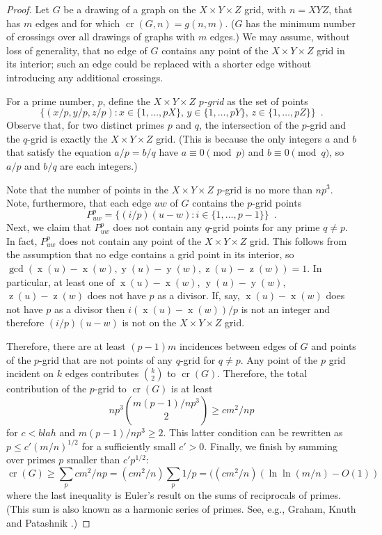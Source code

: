 \documentclass{patmorin}
\DeclareMathOperator{\x}{x}
\DeclareMathOperator{\y}{y}
\DeclareMathOperator{\z}{z}
\DeclareMathOperator{\crs}{cr}
\begin{document}
\begin{proof}
Let $G$ be a drawing of a graph on the $X\times Y\times Z$ grid, with
$n=XYZ$, that has $m$ edges and for which $\crs(G,n)=g(n,m)$. ($G$
has the minimum number of crossings over all drawings of graphs with
$m$ edges.)  We may assume, without loss of generality, that no edge of
$G$ contains any point of the $X\times Y\times Z$ grid in its interior;
such an edge could be replaced with a shorter edge without introducing
any additional crossings.

For a prime number, $p$, define the $X\times Y\times Z$ \emph{$p$-grid}
as the set of points
\[
  \{(x/p,y/p,z/p): x\in\{1,\ldots,pX\},\, y\in\{1,\ldots,pY\},\,
  z\in\{1,\ldots,pZ\}\} \enspace .
\]
Observe that, for two distinct primes $p$ and $q$, the intersection
of the $p$-grid and the $q$-grid is exactly the $X\times Y\times Z$
grid. (This is because the only integers $a$ and $b$ that satisfy the
equation $a/p = b/q$ have $a\equiv 0 \pmod{p}$ and $b\equiv 0\pmod q$,
so $a/p$ and $b/q$ are each integers.)

Note that the number of points in the $X\times Y\times Z$ $p$-grid is
no more than $np^3$.  Note, furthermore, that each edge $uw$ of $G$
contains the $p$-grid points
\[
    P_{uw}^p = \{ (i/p)(u-w) : i\in\{1,\ldots,p-1\} \} \enspace .
\]
Next, we claim that $P_{uw}^p$ does not contain any $q$-grid points for
any prime $q\neq p$.  In fact, $P_{uw}^p$ does not contain any point of
the $X\times Y\times Z$ grid.  This follows from the assumption that
no edge contains a grid point in its interior, so $\gcd(\x(u)-\x(w),
\y(u)-\y(w), \z(u)-\z(w))=1$.  In particular, at least one of
$\x(u)-\x(w)$, $\y(u)-\y(w)$, $\z(u)-\z(w)$ does not have $p$ as a
divisor.  If, say, $\x(u)-\x(w)$ does not have $p$ as a divisor then
$i(\x(u)-\x(w))/p$ is not an integer and therefore $(i/p)(u-w)$ is not
on the $X\times Y\times Z$ grid.

Therefore, there are at least $(p-1)m$ incidences between edges of $G$
and points of the $p$-grid that are not points of any $q$-grid for $q\neq p$.
Any point of the $p$ grid incident
on $k$ edges contributes $\binom{k}{2}$ to $\crs(G)$.  Therefore, the
total contribution of the $p$-grid to $\crs(G)$ is at least
\[
    np^3\binom{m(p-1)/np^3}{2} \ge cm^2/np
\]
for $c<blah$ and $m(p-1)/np^3 \ge 2$.  This latter condition can be rewritten
as $p \le c'(m/n)^{1/2}$ for a sufficiently small $c'>0$.
Finally, we finish by summing over primes $p$ smaller than $c'p^{1/2}$:
\[
   \crs(G) \ge \sum_{p} cm^2/np = (cm^2/n) \sum_{p} 1/p = ((cm^2/n)(\ln\ln(m/n)-O(1))
\]
where the last inequality is Euler's result on the sums of reciprocals
of primes. (This sum is also known as a harmonic series of primes.  See,
e.g., Graham, Knuth and Patashnik \cite[pages~22--25]{gkpXX}.)
\end{proof}
\end{document}
